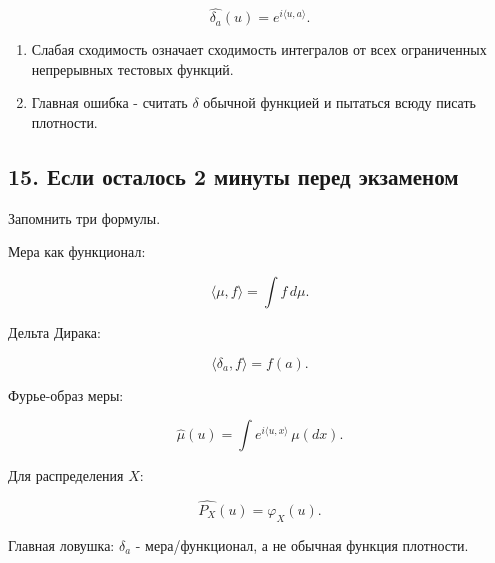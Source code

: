 \documentclass[
  11pt,
  a4paper,
]{article}
\providecommand{\tightlist}{%
  \setlength{\itemsep}{0pt}\setlength{\parskip}{0pt}}
\begin{document}
\[
\widehat{\delta_a}(u)=e^{i\langle u,a\rangle}.
\]

\begin{enumerate}
\def\labelenumi{\arabic{enumi}.}
\setcounter{enumi}{10}
\tightlist
\item
  Слабая сходимость означает сходимость интегралов от всех ограниченных
  непрерывных тестовых функций.
\item
  Главная ошибка - считать \(\delta\) обычной функцией и пытаться всюду
  писать плотности.
\end{enumerate}

\subsection{15. Если осталось 2 минуты перед
экзаменом}\label{ux435ux441ux43bux438-ux43eux441ux442ux430ux43bux43eux441ux44c-2-ux43cux438ux43dux443ux442ux44b-ux43fux435ux440ux435ux434-ux44dux43aux437ux430ux43cux435ux43dux43eux43c}

Запомнить три формулы.

Мера как функционал:

\[
\langle\mu,f\rangle=\int f\,d\mu.
\]

Дельта Дирака:

\[
\langle\delta_a,f\rangle=f(a).
\]

Фурье-образ меры:

\[
\widehat\mu(u)=\int e^{i\langle u,x\rangle}\,\mu(dx).
\]

Для распределения \(X\):

\[
\widehat{P_X}(u)=\varphi_X(u).
\]

Главная ловушка: \(\delta_a\) - мера/функционал, а не обычная функция
плотности.

\newpage
\end{document}
